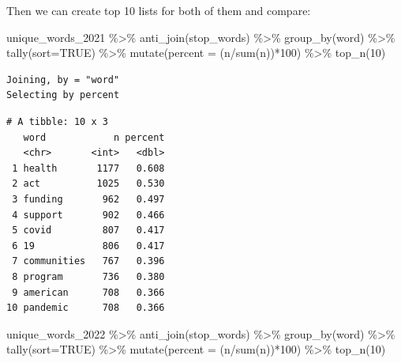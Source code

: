 \documentclass[
  letterpaper,
  DIV=11,
  numbers=noendperiod]{scrreprt}
\newenvironment{Shaded}{\begin{snugshade}}{\end{snugshade}}
\newcommand{\AttributeTok}[1]{\textcolor[rgb]{0.40,0.45,0.13}{#1}}
\newcommand{\ConstantTok}[1]{\textcolor[rgb]{0.56,0.35,0.01}{#1}}
\newcommand{\DecValTok}[1]{\textcolor[rgb]{0.68,0.00,0.00}{#1}}
\newcommand{\FunctionTok}[1]{\textcolor[rgb]{0.28,0.35,0.67}{#1}}
\newcommand{\NormalTok}[1]{\textcolor[rgb]{0.00,0.23,0.31}{#1}}
\newcommand{\SpecialCharTok}[1]{\textcolor[rgb]{0.37,0.37,0.37}{#1}}
\begin{document}
Then we can create top 10 lists for both of them and compare:

\begin{Shaded}
\begin{Highlighting}[]
\NormalTok{unique\_words\_2021 }\SpecialCharTok{\%\textgreater{}\%}
  \FunctionTok{anti\_join}\NormalTok{(stop\_words) }\SpecialCharTok{\%\textgreater{}\%}
  \FunctionTok{group\_by}\NormalTok{(word) }\SpecialCharTok{\%\textgreater{}\%}
  \FunctionTok{tally}\NormalTok{(}\AttributeTok{sort=}\ConstantTok{TRUE}\NormalTok{) }\SpecialCharTok{\%\textgreater{}\%}
  \FunctionTok{mutate}\NormalTok{(}\AttributeTok{percent =}\NormalTok{ (n}\SpecialCharTok{/}\FunctionTok{sum}\NormalTok{(n))}\SpecialCharTok{*}\DecValTok{100}\NormalTok{) }\SpecialCharTok{\%\textgreater{}\%}
  \FunctionTok{top\_n}\NormalTok{(}\DecValTok{10}\NormalTok{)}
\end{Highlighting}
\end{Shaded}

\begin{verbatim}
Joining, by = "word"
Selecting by percent
\end{verbatim}

\begin{verbatim}
# A tibble: 10 x 3
   word            n percent
   <chr>       <int>   <dbl>
 1 health       1177   0.608
 2 act          1025   0.530
 3 funding       962   0.497
 4 support       902   0.466
 5 covid         807   0.417
 6 19            806   0.417
 7 communities   767   0.396
 8 program       736   0.380
 9 american      708   0.366
10 pandemic      708   0.366
\end{verbatim}

\begin{Shaded}
\begin{Highlighting}[]
\NormalTok{unique\_words\_2022 }\SpecialCharTok{\%\textgreater{}\%}
  \FunctionTok{anti\_join}\NormalTok{(stop\_words) }\SpecialCharTok{\%\textgreater{}\%}
  \FunctionTok{group\_by}\NormalTok{(word) }\SpecialCharTok{\%\textgreater{}\%}
  \FunctionTok{tally}\NormalTok{(}\AttributeTok{sort=}\ConstantTok{TRUE}\NormalTok{) }\SpecialCharTok{\%\textgreater{}\%}
  \FunctionTok{mutate}\NormalTok{(}\AttributeTok{percent =}\NormalTok{ (n}\SpecialCharTok{/}\FunctionTok{sum}\NormalTok{(n))}\SpecialCharTok{*}\DecValTok{100}\NormalTok{) }\SpecialCharTok{\%\textgreater{}\%}
  \FunctionTok{top\_n}\NormalTok{(}\DecValTok{10}\NormalTok{)}
\end{Highlighting}
\end{Shaded}
\end{document}
